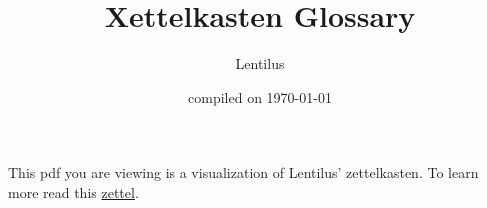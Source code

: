 \documentclass[a4paper]{article}
\title{Xettelkasten Glossary}
\author{Lentilus}
\date{compiled on \today}
\begin{document}
\maketitle

\begin{mdframed}[nobreak=false, topline=false,bottomline=false, rightline=false]
   This pdf you are viewing is a visualization of Lentilus' zettelkasten. To learn more read this \hyperlink{Intro}{zettel}.
\end{mdframed}
\newpage

\end{document}
